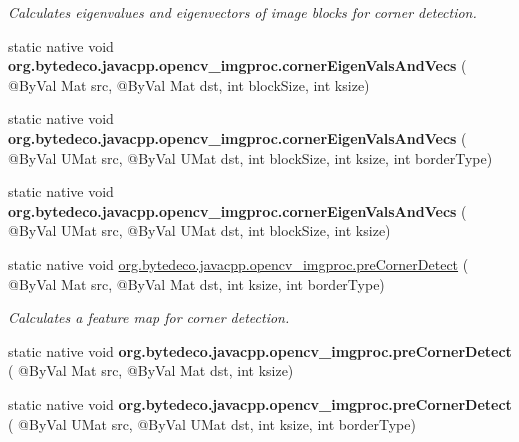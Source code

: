 \begin{DoxyCompactItemize}
\begin{DoxyCompactList}\small\item\em Calculates eigenvalues and eigenvectors of image blocks for corner detection. \end{DoxyCompactList}\item 
\mbox{\label{group__imgproc__feature_gaa024005c471f202ddf35658167c16413}} 
static native void {\bfseries org.\+bytedeco.\+javacpp.\+opencv\+\_\+imgproc.\+corner\+Eigen\+Vals\+And\+Vecs} ( @By\+Val Mat src, @By\+Val Mat dst, int block\+Size, int ksize)
\item 
\mbox{\label{group__imgproc__feature_ga021abd4c0466ae11974d9e3f46dcd20e}} 
static native void {\bfseries org.\+bytedeco.\+javacpp.\+opencv\+\_\+imgproc.\+corner\+Eigen\+Vals\+And\+Vecs} ( @By\+Val U\+Mat src, @By\+Val U\+Mat dst, int block\+Size, int ksize, int border\+Type)
\item 
\mbox{\label{group__imgproc__feature_ga59360224c0236e57dbecc974e0c023a7}} 
static native void {\bfseries org.\+bytedeco.\+javacpp.\+opencv\+\_\+imgproc.\+corner\+Eigen\+Vals\+And\+Vecs} ( @By\+Val U\+Mat src, @By\+Val U\+Mat dst, int block\+Size, int ksize)
\item 
static native void \hyperlink{group__imgproc__feature_ga1c51e6cab3684b202f45967edc555f5c}{org.\+bytedeco.\+javacpp.\+opencv\+\_\+imgproc.\+pre\+Corner\+Detect} ( @By\+Val Mat src, @By\+Val Mat dst, int ksize, int border\+Type)
\begin{DoxyCompactList}\small\item\em Calculates a feature map for corner detection. \end{DoxyCompactList}\item 
\mbox{\label{group__imgproc__feature_gaa253d96bdbd43bc3c7b8338df8daaeb1}} 
static native void {\bfseries org.\+bytedeco.\+javacpp.\+opencv\+\_\+imgproc.\+pre\+Corner\+Detect} ( @By\+Val Mat src, @By\+Val Mat dst, int ksize)
\item 
\mbox{\label{group__imgproc__feature_ga28c9141a0e8f3cbe17e40c533d8fb446}} 
static native void {\bfseries org.\+bytedeco.\+javacpp.\+opencv\+\_\+imgproc.\+pre\+Corner\+Detect} ( @By\+Val U\+Mat src, @By\+Val U\+Mat dst, int ksize, int border\+Type)

\end{DoxyCompactItemize}
